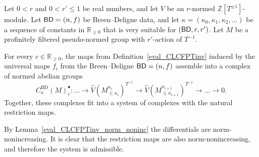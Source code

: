 \begin{definition}
  \label{BD_system}
  \leanok
  Let $0 < r$ and $0 < r' \le 1$ be real numbers,
  and let $V$ be an $r$-normed $\mathbb Z[T^{\pm 1}]$-module.
  Let $\mathsf{BD} = (n,f)$ be Breen--Deligne data,
  and let $\kappa = (\kappa_0, \kappa_1, \kappa_2, \dots)$
  be a sequence of constants in $\mathbb R_{\ge 0}$
  that is very suitable for $(\mathsf{BD}, r, r')$.
  Let $M$ be a profinitely filtered pseudo-normed group with $r'$-action of $T^{-1}$.

  For every $c \in \mathbb R_{\ge 0}$,
  the maps from Definition~\ref{eval_CLCFPTinv}
  induced by the universal maps $f_i$ from the Breen--Deligne $\mathsf{BD} = (n,f)$
  assemble into a complex of normed abelian groups
  \[
    C^{\text{BD}}_{\kappa}(M)_c^\bullet \colon
    \dots \to
    \hat V(M_{\le \kappa_i}^{n_i})^{T^{-1}}
    \to
    \hat V(M_{\le \kappa_{i+1}}^{n_{i+1}})^{T^{-1}}
    \to \dots \to 0.
  \]
  Together, these complexes fit into a system of complexes
  with the natural restriction maps.

  By Lemma~\ref{eval_CLCFPTinv_norm_noninc} the differentials are norm-nonincreasing.
  It is clear that the restriction maps are also norm-nonincreasing,
  and therefore the system is admissible.
\end{definition}

